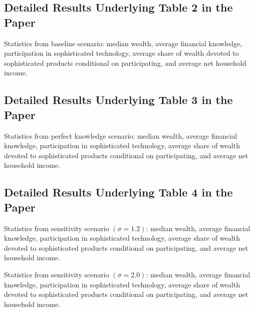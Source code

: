 \documentclass[10pt, oneside]{article}   	%
\begin{document}
\subsection*{Detailed Results Underlying Table 2 in the Paper}

\begin{table}[H]
\centering

\caption{Statistics from baseline scenario: median wealth, average financial knowledge, participation in sophisticated technology, average share of wealth devoted to sophisticated products conditional on participating, and average net household income.}
\end{table}

\pagebreak

\subsection*{Detailed Results Underlying Table 3 in the Paper}

\begin{table}[H]
\centering

\caption{Statistics from perfect knowledge scenario: median wealth, average financial knowledge, participation in sophisticated technology, average share of wealth devoted to sophisticated products conditional on participating, and average net household income.}
\end{table}

\pagebreak

\subsection*{Detailed Results Underlying Table 4 in the Paper}


\begin{table}[H]
\centering

\caption{Statistics from sensitivity scenario $(\sigma = 1.2)$: median wealth, average financial knowledge, participation in sophisticated technology, average share of wealth devoted to sophisticated products conditional on participating, and average net household income.}
\end{table}

\begin{table}[H]
\centering

\caption{Statistics from sensitivity scenario $(\sigma = 2.0)$: median wealth, average financial knowledge, participation in sophisticated technology, average share of wealth devoted to sophisticated products conditional on participating, and average net household income.}
\end{table}
\end{document}
